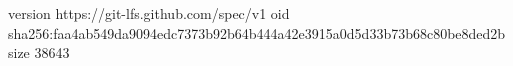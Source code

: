 version https://git-lfs.github.com/spec/v1
oid sha256:faa4ab549da9094edc7373b92b64b444a42e3915a0d5d33b73b68c80be8ded2b
size 38643
